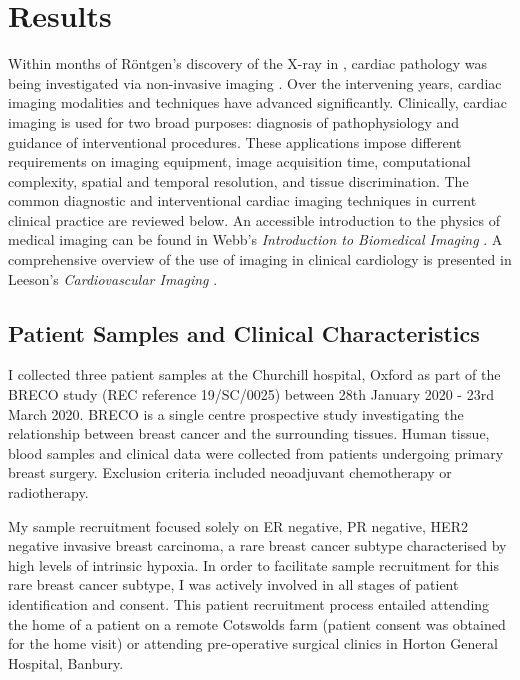 \section{Results}\label{app:imaging}

Within months of Röntgen's discovery of the X-ray in \cite{gagliardi_rontgen_1996}, cardiac pathology was being investigated via non-invasive imaging \cite{gagliardi_cardiac_1996}.  Over the intervening years, cardiac imaging modalities and techniques have advanced significantly.  Clinically, cardiac imaging is used for two broad purposes: diagnosis of pathophysiology and guidance of interventional procedures.  These applications impose different requirements on imaging equipment, image acquisition time, computational complexity, spatial and temporal resolution, and tissue discrimination.  The common diagnostic and interventional cardiac imaging techniques in current clinical practice are reviewed below.  An accessible introduction to the physics of medical imaging can be found in Webb's \textit{Introduction to Biomedical Imaging} \cite{webb_introduction_2002}.  A comprehensive overview of the use of imaging in clinical cardiology is presented in Leeson's \textit{Cardiovascular Imaging} \cite{leeson_cardiovascular_2011}.

\subsection{Patient Samples and Clinical Characteristics}
I collected three patient samples at the Churchill hospital, Oxford as part of the BRECO study (REC reference 19/SC/0025) between 28th January 2020 - 23rd March 2020. BRECO is a single centre prospective study investigating the relationship between breast cancer and the surrounding tissues. Human tissue, blood samples and clinical data were collected from patients undergoing primary breast surgery. Exclusion criteria included neoadjuvant chemotherapy or radiotherapy.


My sample recruitment focused solely on ER negative, PR negative, HER2 negative invasive breast carcinoma, a rare breast cancer subtype characterised by high levels of intrinsic hypoxia. In order to facilitate sample recruitment for this rare breast cancer subtype, I was actively involved in all stages of patient identification and consent. This patient recruitment process entailed attending the home of a patient on a remote Cotswolds farm (patient consent was obtained for the home visit) or attending pre-operative surgical clinics in Horton General Hospital, Banbury.


